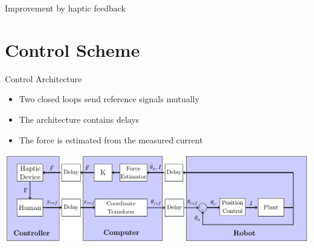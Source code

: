 \begin{frame}{Improvement by haptic feedback}{}
{
}

 \end{frame}




\section{Control Scheme}




\begin{frame}{Control Architecture}{}
  \begin{itemize}
    \item<1-> Two closed loops send reference signals mutually
    \item<2-> The architecture contains delays
    \item<3-> The force is estimated from the measured current
    \end{itemize}
    
    \includegraphics[width=\textwidth]{Billeder/Dan/control.pdf}
\end{frame}

